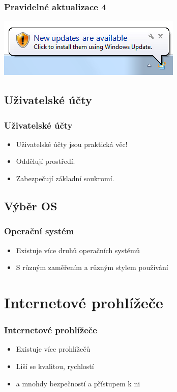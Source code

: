 \documentclass[xetex]{beamer}
\begin{document}
\begin{frame}
 	\frametitle{Pravidelné aktualizace 4} 
	\includegraphics{pic/win-update.png}
\end{frame}

\subsection{Uživatelské účty}

\begin{frame}
	\frametitle{Uživatelské účty} 
	\begin{itemize} 
   		\item Uživatelské účty jsou praktická věc!
	   	\item Oddělují prostředí.
   		\item Zabezpečují základní soukromí.
	\end{itemize} 
\end{frame}

\subsection{Výběr OS}

\begin{frame}
 	\frametitle{Operační systém} 
 	\begin{itemize} 
   		\item Existuje více druhů operačních systémů
   		\item S různým zaměřením a různým stylem používání
 	\end{itemize} 
\end{frame}

\section{Internetové prohlížeče}

\begin{frame}
	\frametitle{Internetové prohlížeče} 
	\begin{itemize} 
   		\item Existuje více prohlížečů
		\item Liší se kvalitou, rychlostí
   		\item a mnohdy bezpečností a přístupem k ni
	\end{itemize} 
\end{frame}
\end{document}
